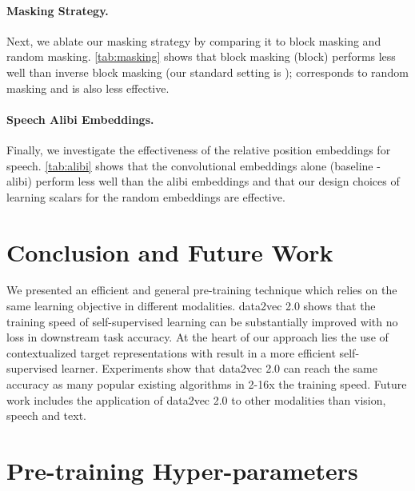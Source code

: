 \documentclass[nohyperref]{article}
\theoremstyle{plain}
\theoremstyle{definition}
\theoremstyle{remark}
\newcommand{\name}{data2vec 2.0}
\begin{document}
\paragraph{Masking Strategy.}
Next, we ablate our masking strategy by comparing it to block masking and random masking. 
\autoref{tab:masking} shows that block masking (block) performs less well than inverse block masking (our standard setting is );  corresponds to random masking and is also less effective.

\paragraph{Speech Alibi Embeddings.}
Finally, we investigate the effectiveness of the relative position embeddings for speech.
\autoref{tab:alibi} shows that the convolutional embeddings alone (baseline - alibi) perform less well than the alibi embeddings and that our design choices of learning scalars for the random embeddings are effective. 


\section{Conclusion and Future Work}
We presented an efficient and general pre-training technique which relies on the same learning objective in different modalities. 
\name{} shows that the training speed of self-supervised learning can be substantially improved with no loss in downstream task accuracy.
At the heart of our approach lies the use of contextualized target representations with result in a more efficient self-supervised learner.
Experiments show that \name{} can reach the same accuracy as many popular existing algorithms in 2-16x the training speed.
Future work includes the application of \name{} to other modalities than vision, speech and text. 



















\newpage
\appendix
\onecolumn

\section{Pre-training Hyper-parameters}
\label{appendix:hyper}
\end{document}
